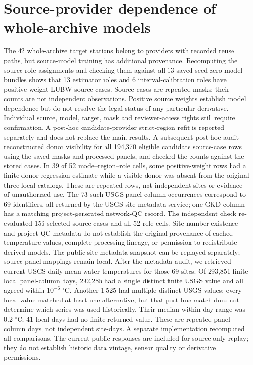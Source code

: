 \section{Source-provider dependence of whole-archive models}
The 42 whole-archive target stations belong to providers with recorded reuse paths, but source-model training has additional provenance. Recomputing the source role assignments and checking them against all 13 saved seed-zero model bundles shows that 13 estimator roles and 6 interval-calibration roles have positive-weight LUBW source cases. Source cases are repeated masks; their counts are not independent observations. Positive source weights establish model dependence but do not resolve the legal status of any particular derivative. Individual source, model, target, mask and reviewer-access rights still require confirmation. A post-hoc candidate-provider strict-region refit is reported separately and does not replace the main results.
A subsequent post-hoc audit reconstructed donor visibility for all 194,370 eligible candidate source-case rows using the saved masks and processed panels, and checked the counts against the stored cases. In 39 of 52 mode--region--role cells, some positive-weight rows had a finite donor-regression estimate while a visible donor was absent from the original three local catalogs. These are repeated rows, not independent sites or evidence of unauthorized use. The 73 such USGS panel-column occurrences correspond to 69 identifiers, all returned by the USGS site metadata service; one GKD column has a matching project-generated network-QC record. The independent check re-evaluated 156 selected source cases and all 52 role cells. Site-number existence and project QC metadata do not establish the original provenance of cached temperature values, complete processing lineage, or permission to redistribute derived models. The public site metadata snapshot can be replayed separately; source panel mappings remain local.
After the metadata audit, we retrieved current USGS daily-mean water temperatures for those 69 sites. Of 293,851 finite local panel-column days, 292,285 had a single distinct finite USGS value and all agreed within $10^{-6}$ $^{\circ}$C. Another 1,525 had multiple distinct USGS values; every local value matched at least one alternative, but that post-hoc match does not determine which series was used historically. Their median within-day range was 0.2 $^{\circ}$C; 41 local days had no finite returned value. These are repeated panel-column days, not independent site-days. A separate implementation recomputed all comparisons. The current public responses are included for source-only replay; they do not establish historic data vintage, sensor quality or derivative permissions.
